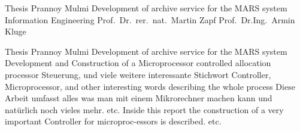 



													{ Thesis }																			%
													{Prannoy Mulmi}														%
													{Development of archive 
													service for the MARS system}											  %
													{Information Engineering}						%
													{Prof.\ Dr.\ rer.\ nat.\ Martin Zapf}					%
													{Prof.\ Dr.\-Ing.\ Armin Kluge}								%
													

													{ Thesis }																			%
													{Prannoy Mulmi}														%
													{Development of archive 
													service for the MARS system}											  %
													{Development and Construction of a Microprocessor 
													controlled allocation processor}							%
													{Steuerung, und viele weitere interessante 
													Stichwort}																		%
													{Controller, Microprocessor, and other 
													interesting words describing the whole 
													process}																			%
													{Diese Arbeit umfasst alles was man mit einem 
													Mikrorechner machen kann und nat\"urlich noch vieles mehr.
													etc.}																					%
													{Inside this report the construction of a very 
													important Controller for microproc-essors is 
													described.												
													etc.}																			%

